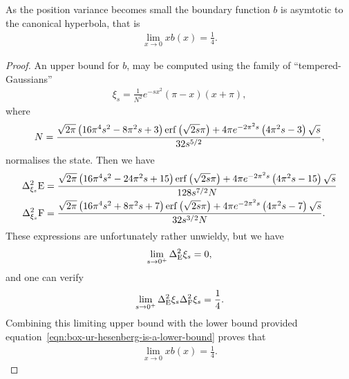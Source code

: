 \begin{lem}\label{lem:box-ur-b-asymtotic-to-hyperbola}
  As the position variance becomes small the boundary function $b$ is asymtotic to the canonical hyperbola, that is
  \begin{align}
    \lim_{x\to 0} x b(x) = \frac{1}{4}.
  \end{align}
\end{lem}
\begin{proof}
An upper bound for $b$, may be computed using the family of ``tempered-Gaussians''
\begin{align}
  \xi_s = \frac{1}{N^2} e^{-s x^2} (\pi-x)(x+\pi),
\end{align}
where
\begin{align}
  N = \frac{\sqrt{2 \pi } \left(16 \pi^4 s^2-8 \pi^2 s+3\right) \operatorname{erf}\left(\sqrt{2s} \pi \right)+4 \pi  e^{-2 \pi ^2 s} \left(4 \pi ^2 s-3\right) \sqrt{s}}{32 s^{5/2}},
\end{align}
normalises the state. Then we have
\begin{align}
  \var[\xi_s]{\ope} &= \frac{\sqrt{2 \pi } \left(16 \pi ^4 s^2-24 \pi ^2 s+15\right) \erf\left(\sqrt{2s} \pi\right)+4 \pi  e^{-2 \pi ^2 s} \left(4 \pi ^2 s-15\right) \sqrt{s}}{128 s^{7/2}N}\\
  \var[\xi_s]{\opf} &= \frac{\sqrt{2 \pi } \left(16 \pi ^4 s^2+8 \pi ^2 s+7\right) \erf\left(\sqrt{2s} \pi\right)+4 \pi  e^{-2 \pi ^2 s} \left(4 \pi ^2 s-7\right) \sqrt{s}}{32 s^{3/2}N }.
\end{align}
These expressions are unfortunately rather unwieldy, but we have
\begin{align}
  \lim_{s\to 0^+} \var[\ope]{\xi_s} = 0,
\end{align}
and one can verify
\begin{align}
  \lim_{s\to 0^+} \var[\ope]{\xi_s}\var[\opf]{\xi_s} = \frac{1}{4}.
\end{align}
Combining this limiting upper bound with the lower bound provided equation~\ref{eqn:box-ur-hesenberg-is-a-lower-bound} proves that
\begin{align}
  \lim_{x\to 0} x b(x) = \frac{1}{4}.
\end{align}
\end{proof}

